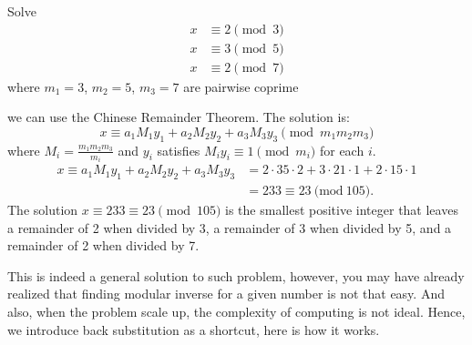         \begin{example}
            Solve
            \begin{align*}
                x &\equiv 2 \pmod{3} \\
                x &\equiv 3 \pmod{5} \\
                x &\equiv 2 \pmod{7}
                \end{align*}
                where $m_1 = 3$, $m_2 = 5$, $m_3 = 7$ are pairwise coprime

                we can use the Chinese Remainder Theorem. The solution is:
                \[x \equiv a_1M_1y_1 + a_2M_2y_2 + a_3M_3y_3 \pmod{m_1m_2m_3}\]
                where $M_i = \frac{m_1m_2m_3}{m_i}$ and $y_i$ satisfies $M_iy_i \equiv 1 \pmod{m_i}$ for each $i$.
                \begin{align*}
                    x\equiv a_{1}M_{1}y_{1}+a_{2}M_{2}y_{2}+a_{3}M_{3}y_{3}& =2\cdot35\cdot2+3\cdot21\cdot1+2\cdot15\cdot1  \\
                    &=233\equiv23\mathrm{~(mod~}105).
                \end{align*}
                The solution $x \equiv 233 \equiv 23 \pmod{105}$ is the smallest positive integer that leaves a remainder of 2 when divided by 3, a remainder of 3 when divided by 5, and a remainder of 2 when divided by 7.
        \end{example}

        This is indeed a general solution to such problem, however, you may have already realized that finding 
        modular inverse for a given number is not that easy. And also, when the problem scale up, the complexity of computing
        is not ideal. Hence, we introduce back substitution as a shortcut, here is how it works.

